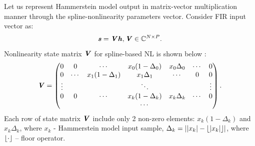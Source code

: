 \documentclass[12pt]{article}
\newcommand{\bit}[1]{\ensuremath{\textbf{\textit{#1}}}}
\DeclarePairedDelimiter\floor{\lfloor}{\rfloor}
\begin{document}
Let us represent Hammerstein model output in matrix-vector multiplication manner through the spline-nonlinearity parameters vector. Consider FIR input vector as:
\begin{equation}
    \bit{s}=\bit{V}\bit{h}, \bit{V}\in\mathbb{C}^{N\times P}.
    \label{fir_input_vector}
\end{equation}
Nonlinearity state matrix \bit{V} for spline-based NL is shown below \cite{lut_dpd}:
\begin{equation*}
    \bit{V}=\begin{pmatrix}
        0 & 0 & \cdots & x_0(1-\Delta_0) & x_0\Delta_0 & \cdots & 0 \\
        0 & \cdots & x_1(1-\Delta_1) & x_1\Delta_1 & \cdots & 0 & 0 \\
        \vdots & & & \ddots & & & \vdots \\
        0 & 0 & \cdots & x_k(1-\Delta_k) & x_k\Delta_k & \cdots & 0 \\
        & & & \cdots & & &
    \end{pmatrix}.
\end{equation*}
Each row of state matrix \bit{V} include only 2 non-zero elements: $x_k(1-\Delta_k)$ and $x_k\Delta_k$, where $x_k$ - Hammerstein model input sample, $\Delta_k=||x_k|-\floor*{|x_k|}|$, where $\floor*{\cdot}$ -- floor operator. 
\end{document}
